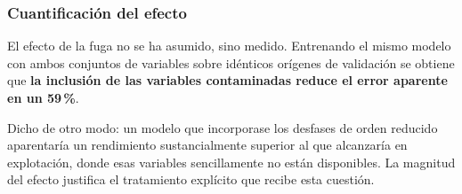\subsubsection*{Cuantificación del efecto}

El efecto de la fuga no se ha asumido, sino medido. Entrenando el mismo modelo con
ambos conjuntos de variables sobre idénticos orígenes de validación se obtiene que
\textbf{la inclusión de las variables contaminadas reduce el error aparente en un
59\,\%}.

Dicho de otro modo: un modelo que incorporase los desfases de orden reducido
aparentaría un rendimiento sustancialmente superior al que alcanzaría en
explotación, donde esas variables sencillamente no están disponibles. La magnitud
del efecto justifica el tratamiento explícito que recibe esta cuestión.

